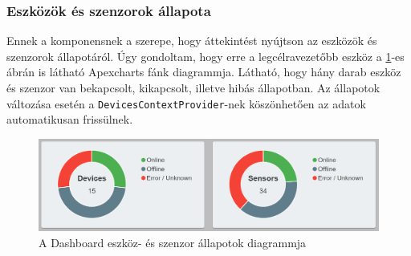 \subsubsection{Eszközök és szenzorok állapota}
Ennek a komponensnek a szerepe, hogy áttekintést nyújtson az eszközök és szenzorok állapotáról.
Úgy gondoltam, hogy erre a legcélravezetőbb eszköz a \ref{fig:dashboard-donut}-es ábrán is látható Apexcharts fánk diagrammja.
Látható, hogy hány darab eszköz és szenzor van bekapcsolt, kikapcsolt, illetve hibás állapotban.
Az állapotok változása esetén a \verb+DevicesContextProvider+-nek köszönhetően az adatok automatikusan frissülnek.
\begin{figure}[!ht]
    \centering
    \includegraphics[width=150mm, keepaspectratio]{figures/dashboard-donut-devices.png}
    \caption{A Dashboard eszköz- és szenzor állapotok diagrammja}
    \label{fig:dashboard-donut}
\end{figure}
